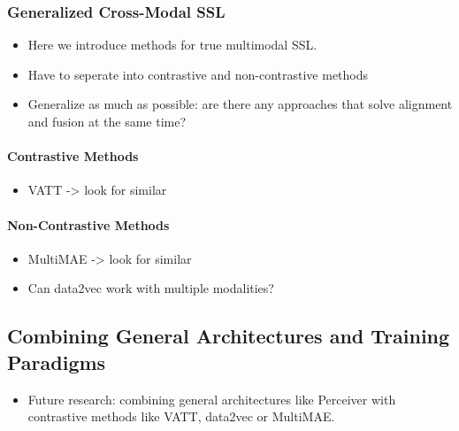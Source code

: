 \documentclass[
]{krantz}
\providecommand{\tightlist}{%
  \setlength{\itemsep}{0pt}\setlength{\parskip}{0pt}}
\begin{document}
\hypertarget{generalized-cross-modal-ssl}{%
\subsubsection{Generalized Cross-Modal SSL}\label{generalized-cross-modal-ssl}}

\begin{itemize}
\tightlist
\item
  Here we introduce methods for true multimodal SSL.
\item
  Have to seperate into contrastive and non-contrastive methods
\item
  Generalize as much as possible: are there any approaches that solve alignment and fusion at the same time?
\end{itemize}

\hypertarget{contrastive-methods}{%
\paragraph{Contrastive Methods}\label{contrastive-methods}}

\begin{itemize}
\tightlist
\item
  VATT -\textgreater{} look for similar
\end{itemize}

\hypertarget{non-contrastive-methods}{%
\paragraph{Non-Contrastive Methods}\label{non-contrastive-methods}}

\begin{itemize}
\tightlist
\item
  MultiMAE -\textgreater{} look for similar
\item
  Can data2vec work with multiple modalities?
\end{itemize}

\hypertarget{combining-general-architectures-and-training-paradigms}{%
\subsection{Combining General Architectures and Training Paradigms}\label{combining-general-architectures-and-training-paradigms}}

\begin{itemize}
\tightlist
\item
  Future research: combining general architectures like Perceiver with contrastive methods like VATT, data2vec or MultiMAE.
\end{itemize}
\end{document}
